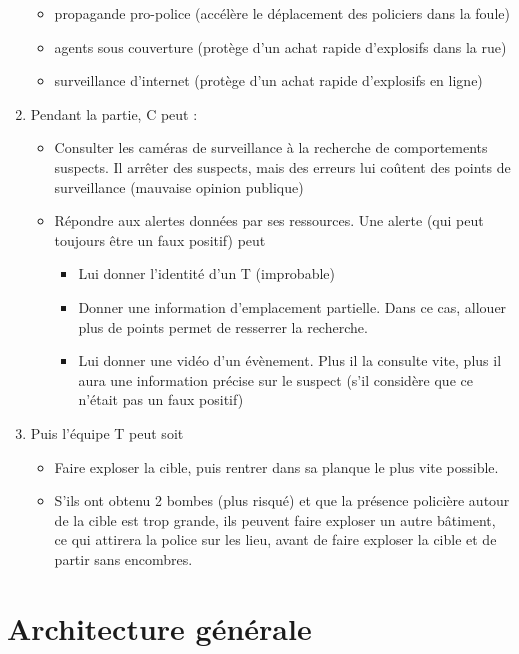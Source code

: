 \documentclass[a4paper,10pt]{article}
\begin{document}
\begin{enumerate}
\begin{itemize}
  \item propagande pro-police (accélère le déplacement des policiers dans la foule)
  \item agents sous couverture (protège d'un achat rapide d'explosifs dans la rue)
  \item surveillance d'internet (protège d'un achat rapide d'explosifs en ligne)
  \end{itemize}
\item Pendant la partie, C peut :
\begin{itemize}
  \item Consulter les caméras de surveillance à la recherche de comportements suspects. Il arrêter des suspects, mais des erreurs lui coûtent des points de surveillance (mauvaise opinion publique)
  \item Répondre aux alertes données par ses ressources. Une alerte (qui peut toujours être un faux positif) peut
  \begin{itemize}
    \item Lui donner l'identité d'un T (improbable)
    \item Donner une information d'emplacement partielle. Dans ce cas, allouer plus de points permet de resserrer la recherche.
    \item Lui donner une vidéo d'un évènement. Plus il la consulte vite, plus il aura une information précise sur le suspect (s'il considère que ce n'était pas un faux positif)
    \end{itemize}
    \end{itemize}
\item Puis l'équipe T peut soit
\begin{itemize}
  \item Faire exploser la cible, puis rentrer dans sa planque le plus vite possible.
  \item S'ils ont obtenu 2 bombes (plus risqué) et que la présence policière autour de la cible est trop grande, ils peuvent faire exploser un autre bâtiment, ce qui attirera la police sur les lieu, avant de faire exploser la cible et de partir sans encombres.
\end{itemize}
\end{enumerate}

\section{Architecture générale}
\end{document}
